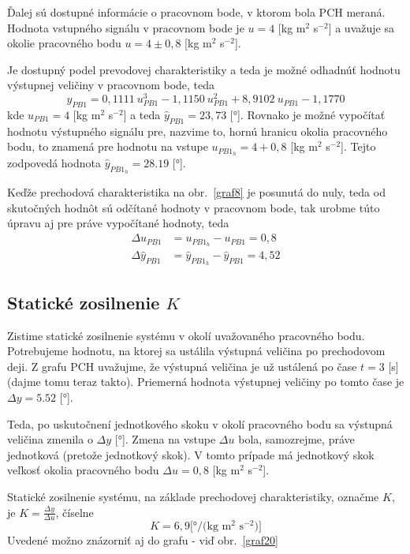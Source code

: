 \documentclass[a4paper, 10pt, ]{article}
\begin{document}
Ďalej sú dostupné informácie o pracovnom bode, v ktorom bola PCH meraná. Hodnota vstupného signálu v pracovnom bode je $u = 4$ [kg m$^2$ s$^{-2}$] a uvažuje sa okolie pracovného bodu $u = 4 \pm 0,8$ [kg m$^2$ s$^{-2}$].

Je dostupný podel prevodovej charakteristiky a teda je možné odhadnúť hodnotu výstupnej veličiny v pracovnom bode, teda
\begin{equation}
    \hat y_{PB1} = 0,1111\ u_{PB1}^3  -1,1150\ u_{PB1}^2 + 8,9102\ u_{PB1}  -1,1770
\end{equation}
kde $u_{PB1} = 4$ [kg m$^2$ s$^{-2}$] a teda $\hat y_{PB1} = 23,73$ [°]. Rovnako je možné vypočítať hodnotu výstupného signálu pre, nazvime to, hornú hranicu okolia pracovného bodu, to znamená pre hodnotu na vstupe $u_{PB1_h} = 4 + 0,8$ [kg m$^2$ s$^{-2}$]. Tejto zodpovedá hodnota $\hat y_{PB1_h} = 28.19$ [°].

Keďže prechodová charakteristika na obr.~\ref{graf8} je posunutá do nuly, teda od skutočných hodnôt sú odčítané hodnoty v pracovnom bode, tak urobme túto úpravu aj pre práve vypočítané hodnoty, teda
\begin{align}
    \Delta u_{PB1} &= u_{PB1_h} - u_{PB1} = 0,8 \\
    \Delta \hat y_{PB1} &= \hat y_{PB1_h} -  \hat y_{PB1} = 4,52
\end{align}




\subsection{Statické zosilnenie $K$}

Zistime statické zosilnenie systému v okolí uvažovaného pracovného bodu. Potrebujeme hodnotu, na ktorej sa ustálila výstupná veličina po prechodovom deji. Z grafu PCH uvažujme, že výstupná veličina je už ustálená po čase $t=3$ [s] (dajme tomu teraz takto). Priemerná hodnota výstupnej veličiny po tomto čase je $\Delta y = 5.52$ [°].

Teda, po uskutočnení jednotkového skoku v okolí pracovného bodu sa výstupná veličina zmenila o $\Delta y$ [°]. Zmena na vstupe $\Delta u$ bola, samozrejme, práve jednotková (pretože jednotkový skok). V tomto prípade má jednotkový skok veľkosť okolia pracovného bodu  $\Delta u = 0,8$ [kg m$^2$ s$^{-2}$].

Statické zosilnenie systému, na základe prechodovej charakteristiky, označme $K$, je $K = \frac{\Delta y}{\Delta u}$, číselne
\begin{equation}
     K = 6,9 \text{[°/(kg m$^2$ s$^{-2}$)]}
\end{equation}
Uvedené možno znázorniť aj do grafu - viď obr.~\ref{graf20}
\end{document}
